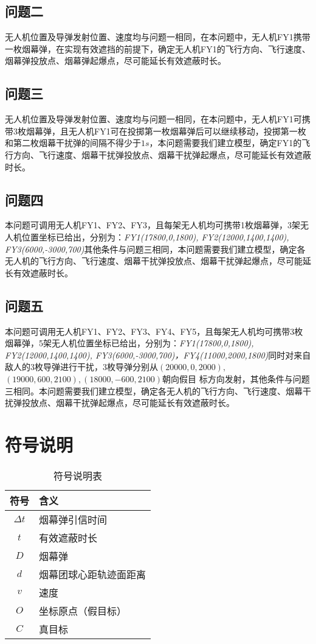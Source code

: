 \documentclass{article}
\begin{document}
\subsection{问题二}

无人机位置及导弹发射位置、速度均与问题一相同，在本问题中，无人机FY1携带一枚烟幕弹，在实现有效遮挡的前提下，确定无人机FY1的飞行方向、飞行速度、烟幕弹投放点、烟幕弹起爆点，尽可能延长有效遮蔽时长。
\subsection{问题三}

无人机位置及导弹发射位置、速度均与问题一相同，在本问题中，无人机FY1可携带3枚烟幕弹，且无人机FY1可在投掷第一枚烟幕弹后可以继续移动，投掷第一枚和第二枚烟幕干扰弹的间隔不得少于$1s$，本问题需要我们建立模型，确定FY1的飞行方向、飞行速度、烟幕干扰弹投放点、烟幕干扰弹起爆点，尽可能延长有效遮蔽时长。
\subsection{问题四}

本问题可调用无人机FY1、FY2、FY3，且每架无人机均可携带1枚烟幕弹，3架无人机位置坐标已给出，分别为：\textit{FY1(17800,0,1800), FY2(12000,1400,1400), FY3(6000,-3000,700)}其他条件与问题三相同，本问题需要我们建立模型，确定各无人机的飞行方向、飞行速度、烟幕干扰弹投放点、烟幕干扰弹起爆点，尽可能延长有效遮蔽时长。
\subsection{问题五}

本问题可调用无人机FY1、FY2、FY3、FY4、FY5，且每架无人机均可携带3枚烟幕弹，5架无人机位置坐标已给出，分别为：\textit{FY1(17800,0,1800), FY2(12000,1400,1400), FY3(6000,-3000,700)，FY4(11000,2000,1800)}同时对来自敌人的3枚导弹进行干扰，3枚导弹分别从$(20000,0,2000),$$(19000,600,2100),(18000,-600,2100)$朝向假目
标方向发射，其他条件与问题三相同。本问题需要我们建立模型，确定各无人机的飞行方向、飞行速度、烟幕干扰弹投放点、烟幕干扰弹起爆点，尽可能延长有效遮蔽时长。

\section{符号说明}

\begin{table}[H]
\centering
\caption{符号说明表}
\begin{tabular}{|c|l|}
\hline
符号 & 含义 \\
\hline
$\Delta t$ & 烟幕弹引信时间 \\
$t$ & 有效遮蔽时长 \\
$D$ & 烟幕弹 \\
$d$ & 烟幕团球心距轨迹面距离 \\
$v$ & 速度 \\
$O$ & 坐标原点（假目标） \\
$C$ & 真目标 \\
\hline
\end{tabular}
\end{table}
\end{document}
